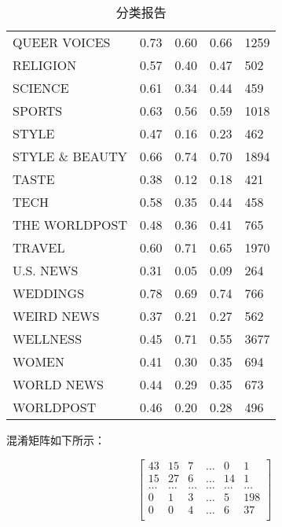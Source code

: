 \documentclass{article}
\begin{document}
\begin{table}[h]
\begin{tabular}{|l|l|l|l|l|}
    QUEER VOICES & 0.73 & 0.60 & 0.66 & 1259 \\
    RELIGION & 0.57 & 0.40 & 0.47 & 502 \\
    SCIENCE & 0.61 & 0.34 & 0.44 & 459 \\
    SPORTS & 0.63 & 0.56 & 0.59 & 1018 \\
    STYLE & 0.47 & 0.16 & 0.23 & 462 \\
    STYLE \& BEAUTY & 0.66 & 0.74 & 0.70 & 1894 \\
    TASTE & 0.38 & 0.12 & 0.18 & 421 \\
    TECH & 0.58 & 0.35 & 0.44 & 458 \\
    THE WORLDPOST & 0.48 & 0.36 & 0.41 & 765 \\
    TRAVEL & 0.60 & 0.71 & 0.65 & 1970 \\
    U.S. NEWS & 0.31 & 0.05 & 0.09 & 264 \\
    WEDDINGS & 0.78 & 0.69 & 0.74 & 766 \\
    WEIRD NEWS & 0.37 & 0.21 & 0.27 & 562 \\
    WELLNESS & 0.45 & 0.71 & 0.55 & 3677 \\
    WOMEN & 0.41 & 0.30 & 0.35 & 694 \\
    WORLD NEWS & 0.44 & 0.29 & 0.35 & 673 \\
    WORLDPOST & 0.46 & 0.20 & 0.28 & 496 \\
    \hline
    \end{tabular}
    \caption{分类报告}
\end{table}


混淆矩阵如下所示：

\[
\begin{bmatrix}
    43 & 15 & 7 & \ldots & 0 & 1 \\
    15 & 27 & 6 & \ldots & 14 & 1 \\
    \ldots & \ldots & \ldots & \ldots & \ldots & \ldots \\
    0 & 1 & 3 & \ldots & 5 & 198 \\
    0 & 0 & 4 & \ldots & 6 & 37 \\
\end{bmatrix}
\]
\end{document}
